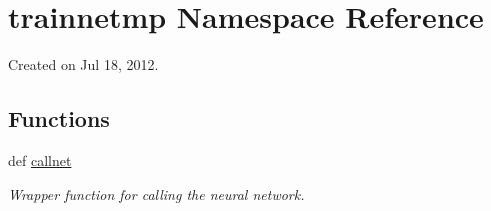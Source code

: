 \hypertarget{namespacetrainnetmp}{
\section{trainnetmp Namespace Reference}
\label{namespacetrainnetmp}
}


Created on Jul 18, 2012.  


\subsection*{Functions}
\begin{DoxyCompactItemize}
\item 
def \hyperlink{namespacetrainnetmp_ae69cdeadf6d4d73bf96600ae218927c4}{callnet}
\begin{DoxyCompactList}\small\item\em Wrapper function for calling the neural network. \item\end{DoxyCompactList}\end{DoxyCompactItemize}
